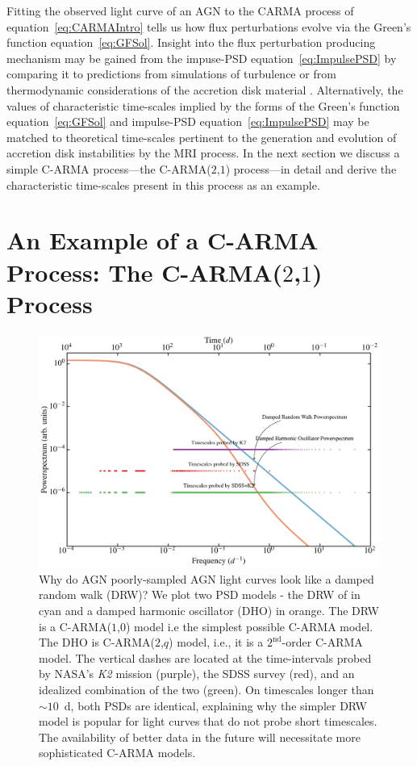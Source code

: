 \documentclass[a4paper,fleqn,usenatbib]{mnras}
\begin{document}
Fitting the observed light curve of an AGN to the CARMA process of equation~\eqref{eq:CARMAIntro} tells us how flux perturbations evolve via the Green's function equation~\eqref{eq:GFSol}. Insight into the flux perturbation producing mechanism may be gained from the impuse-PSD equation~\eqref{eq:ImpulsePSD} by comparing it to predictions from simulations of turbulence \citep{EddySim15} or from thermodynamic considerations of the accretion disk material \citep{Mellen52}. Alternatively, the values of characteristic time-scales implied by the forms of the Green's function equation~\eqref{eq:GFSol} and impulse-PSD equation~\eqref{eq:ImpulsePSD} may be matched to theoretical time-scales pertinent to the generation and evolution of accretion disk instabilities by the MRI process. In the next section we discuss a simple C-ARMA process---the C-ARMA($2$,$1$) process---in detail and derive the characteristic time-scales present in this process as an example.

\section[C-ARMA($2$,$1$)]{An Example of a C-ARMA Process: The C-ARMA($2$,$1$) Process}\label{sec:CARMA21}

\begin{figure}
    \includegraphics[width=\textwidth]{images/PowerOfSDSSK2.jpg}
    \caption{Why do AGN poorly-sampled AGN light curves look like a damped random walk (DRW)? We plot two PSD models - the DRW of \citet{Kelly09} in cyan and a damped harmonic oscillator (DHO) in orange. The DRW is a C-ARMA($1$,$0$) model i.e  the simplest possible C-ARMA model. The DHO is C-ARMA($2$,$q$) model, i.e., it is a $2^{\text{nd}}$-order C-ARMA model. The vertical dashes are located at the time-intervals probed by NASA's \textit{K2} mission (purple), the SDSS survey (red), and an idealized combination of the two (green). On timescales longer than $\sim 10$~d, both PSDs are identical, explaining why the simpler DRW model is popular for light curves that do not probe short timescales. The availability of better data in the future will necessitate more sophisticated C-ARMA models.}
    \label{fig:PowerOfSDSSK2}
\end{figure}
\end{document}
